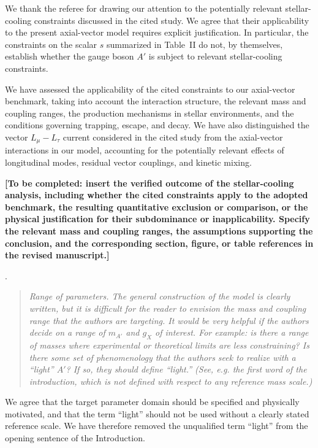 \documentclass[12pt,a4paper]{article}
\begin{document}
We thank the referee for drawing our attention to the potentially relevant stellar-cooling constraints discussed in the cited study. We agree that their applicability to the present axial-vector model requires explicit justification. In particular, the constraints on the scalar \(s\) summarized in Table~II do not, by themselves, establish whether the gauge boson \(A'\) is subject to relevant stellar-cooling constraints.

We have assessed the applicability of the cited constraints to our axial-vector benchmark, taking into account the interaction structure, the relevant mass and coupling ranges, the production mechanisms in stellar environments, and the conditions governing trapping, escape, and decay. We have also distinguished the vector \(L_\mu-L_\tau\) current considered in the cited study from the axial-vector interactions in our model, accounting for the potentially relevant effects of longitudinal modes, residual vector couplings, and kinetic mixing.

\textbf{[To be completed: insert the verified outcome of the stellar-cooling analysis, including whether the cited constraints apply to the adopted benchmark, the resulting quantitative exclusion or comparison, or the physical justification for their subdominance or inapplicability. Specify the relevant mass and coupling ranges, the assumptions supporting the conclusion, and the corresponding section, figure, or table references in the revised manuscript.]}

\medskip
{}. \begin{quote}\itshape
Range of parameters. The general construction of the model is clearly written, but it is difficult for the reader to envision the mass and coupling range that the authors are targeting. It would be very helpful if the authors decide on a range of \(m_{A'}\) and \(g_X\) of interest. For example: is there a range of masses where experimental or theoretical limits are less constraining? Is there some set of phenomenology that the authors seek to realize with a ``light'' \(A'\)? If so, they should define ``light.'' (See, e.g. the first word of the introduction, which is not defined with respect to any reference mass scale.)\end{quote}

We agree that the target parameter domain should be specified and physically motivated, and that the term ``light'' should not be used without a clearly stated reference scale. We have therefore removed the unqualified term ``light'' from the opening sentence of the Introduction.
\end{document}
